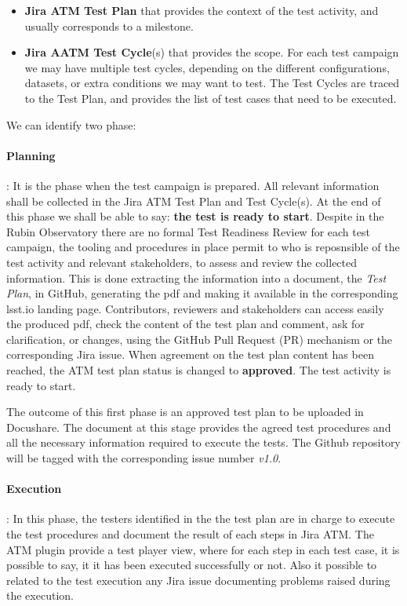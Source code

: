 \begin{itemize}
\item \textbf{Jira ATM Test Plan} that provides the context of the test activity, and usually corresponds to a milestone.
\item \textbf{Jira AATM Test Cycle}(s) that provides the scope. For each test campaign we may have multiple test cycles, 
depending on the different configurations, datasets, or extra conditions we may want to test. The Test Cycles are traced
to the Test Plan, and provides the list of test cases that need to be executed.
\end{itemize}

We can identify two phase:

\paragraph{Planning}:
It is the phase when the test campaign is prepared. All relevant information shall be collected in the Jira ATM Test Plan and 
Test Cycle(s). 
At the end of this phase we shall be able to say: \textbf{the test is ready to start}.
Despite in the Rubin Observatory there are no formal Test Readiness Review for each test campaign, 
the tooling and procedures in place permit to who is reposnsible of the test activity and relevant stakeholders, to assess and review the collected information. 
This is done extracting the information into a document, the \textit{Test Plan}, in GitHub, generating the pdf and making it available
in the corresponding lsst.io landing page. Contributors, reviewers and stakeholders can access easily the produced pdf,
check the content of the test plan and comment, ask for clarification, or changes, using the GitHub
Pull Request (PR) mechanism or the corresponding Jira issue.
When agreement on the test plan content has been reached, the ATM test plan status is changed to \textbf{approved}. The test activity is ready to start.

The outcome of this first phase is an approved test plan to be uploaded in Docushare. 
The document at this stage provides the agreed test procedures and all the necessary information required to execute the tests.
The Github repository will be tagged with the corresponding issue number \textit{v1.0}.

\paragraph{Execution}:
In this phase, the testers identified in the the test plan are in charge to execute the test procedures and 
document the result of each steps in Jira ATM.
The ATM plugin provide a test player view, where for each step in each test case, it is possible to say, it it has been executed successfully or not.
Also it possible to related to the test execution any Jira issue documenting problems raised during the execution.

